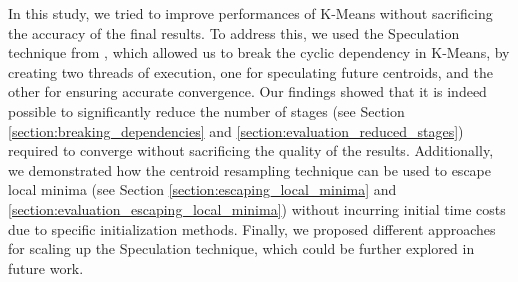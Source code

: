 In this study, we tried to improve performances of K-Means without sacrificing the accuracy of the final results. To address this, we used the Speculation technique from \cite{Sioulas:282304}, which allowed us to break the cyclic dependency in K-Means, by creating two threads of execution, one for speculating future centroids, and the other for ensuring accurate convergence. Our findings showed that it is indeed possible to significantly reduce the number of stages (see Section \ref{section:breaking_dependencies} 
 and \ref{section:evaluation_reduced_stages}) required to converge without sacrificing the quality of the results. Additionally, we demonstrated how the centroid resampling technique can be used to escape local minima (see Section \ref{section:escaping_local_minima} and \ref{section:evaluation_escaping_local_minima}) without incurring initial time costs due to specific initialization methods. Finally, we proposed different approaches for scaling up the Speculation technique, which could be further explored in future work.